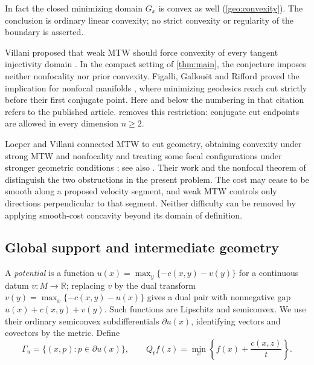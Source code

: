 In fact the closed minimizing domain $G_x$ is convex as well
(\cref{geo:convexity}). The conclusion is ordinary linear convexity;
no strict convexity or regularity of the boundary is asserted.

Villani proposed that weak MTW should force convexity of every tangent
injectivity domain \cite[Section~4.2]{Villani2011}. In the compact setting
of \cref{thm:main}, the conjecture imposes neither nonfocality nor prior
convexity. Figalli, Gallou\"et and Rifford proved the implication for
nonfocal manifolds \cite[Theorem~1.7]{FGR2014}, where minimizing geodesics
reach cut strictly before their first conjugate point. Here and below the
numbering in that citation refers to the published article.
 removes this restriction: conjugate cut endpoints are
allowed in every dimension $n\geq2$.

Loeper and Villani connected MTW to cut geometry, obtaining convexity
under strong MTW and nonfocality and treating some focal configurations
under stronger geometric conditions \cite{LoeperVillani2010}; see also
\cite[Section~3.5.2]{Figalli2010}. Their work and the nonfocal theorem of
\cite{FGR2014} distinguish the two obstructions in the present problem.
The cost may cease to be smooth along a proposed velocity segment, and
weak MTW controls only directions perpendicular to that segment.
Neither difficulty can be removed by applying smooth-cost concavity
beyond its domain of definition.

\subsection{Global support and intermediate geometry}

A \emph{potential} is a function
$u(x)=\max_y\{-c(x,y)-v(y)\}$ for a continuous datum $v:M\to\mathbb R$;
replacing $v$ by the dual transform
$v(y)=\max_x\{-c(x,y)-u(x)\}$ gives a dual pair with nonnegative gap
$u(x)+c(x,y)+v(y)$. Such functions are Lipschitz and semiconvex.
We use their ordinary semiconvex subdifferentials $\partial u(x)$,
identifying vectors and covectors by the metric. Define
\[
 \Gamma_u=\{(x,p):p\in\partial u(x)\},\qquad
 Q_tf(z)=\min_x\left\{f(x)+\frac{c(x,z)}t\right\}.
\]


